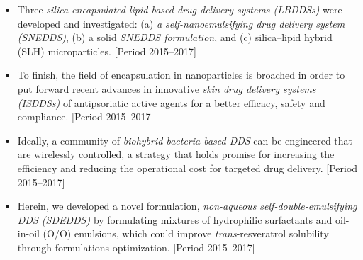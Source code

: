 \documentclass[output=paper]{langscibook}
\begin{document}
\begin{paperappendix}
\begin{itemize}
\item Three \textit{silica encapsulated lipid-based drug delivery systems (LBDDSs)} were developed and investigated: (a) \textit{a self-nanoemulsifying drug delivery system (SNEDDS)}, (b) a solid \textit{SNEDDS formulation}, and (c) silica–lipid hybrid (SLH) microparticles. [Period 2015–2017]
\item To finish, the field of encapsulation in nanoparticles is broached in order to put forward recent advances in innovative \textit{skin drug delivery systems (ISDDSs)} of antipsoriatic active agents for a better efficacy, safety and compliance. [Period 2015–2017]
\item Ideally, a community of \textit{biohybrid bacteria-based DDS} can be engineered that are wirelessly controlled, a strategy that holds promise for increasing the efficiency and reducing the operational cost for targeted drug delivery. [Period 2015–2017]
\item Herein, we developed a novel formulation, \textit{non-aqueous self-double-emulsi\-fying DDS (SDEDDS)} by formulating mixtures of hydrophilic surfactants and oil-in-oil (O/O) emulsions, which could improve \emph{trans}{}-resveratrol solubility through formulations optimization. [Period 2015–2017]
\end{itemize}
\end{paperappendix}
\sloppy\printbibliography[heading=subbibliography,notkeyword=this]
\end{document}

